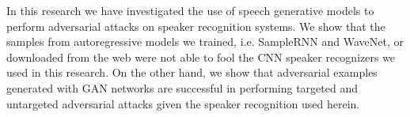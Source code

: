In this research we have investigated the use of speech generative models to
perform adversarial attacks on speaker recognition systems. We show that the
samples from autoregressive models we trained, i.e. SampleRNN and WaveNet, or
downloaded from the web were not able to fool the CNN speaker recognizers we
used in this research. On the other hand, we show that adversarial examples
generated with GAN networks are successful in performing targeted and untargeted
adversarial attacks given the speaker recognition used herein.
